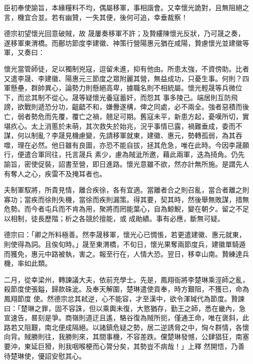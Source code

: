 \begin{pinyinscope}
 臣初奉使諭旨，本緣糧料不均，偶屬移軍，事相諧會。又幸懷光詭對，且無阻絕之言，機宜合並。若有幽贊，一失其便，後何可追，幸垂裁察！



 德宗初望懷光回意破賊，故
 晟屢奏移軍不許；及贄縷陳懷光反狀，乃可晟之奏，遂移軍東渭橋。而鄜坊節度李建徽、神策行營陽惠元猶在咸陽，贄慮懷光並建徽等軍，又奏曰：



 懷光當管師徒，足以獨制兇寇，逗留未進，抑有他由。所患太強，不資傍助。比者又遣李晟、李建徽、陽惠元三節度之眾附麗其營，無益成功，只憂生事。何則？四軍懸壘，群帥異心，論勢力則懸絕高卑，據職名則不相統屬。懷光輕晟等兵微位下，而忿其制不從心。晟等疑懷光養寇蓄奸，而怨其
 事多陵己。端居則互防飛謗，欲戰則遞恐分功，齟齬不和，嫌釁遂構，俾之同處，必不兩全。強者惡積而後亡，弱者勢危而先覆，覆亡之禍，翹足可期。舊寇未平，新患方起，憂嘆所切，實堪疚心。太上消慝於未萌，其次救失於始兆，況乎事情已露，禍難垂成，委而不謀，何以制亂？李晟見機慮變，先請移軍就東，建徽、惠元，勢轉孤弱，為其吞噬，理在必然。他日雖有良圖，亦恐不能自拔，拯其危急，唯在此時。今因李晟願行，便遣合軍同往，托言晟兵
 素少，慮為賊泚所邀，藉此兩軍，迭為掎角。仍先諭旨，密使促裝，詔書至營，即日進路。懷光意雖不欲，然亦計無所施。是謂先人有奪人之心，疾雷不及掩耳者也。



 夫制軍馭將，所貴見情，離合疾徐，各有宜適。當離者合之則召亂，當合者離之則寡功；當疾而徐則失機，當徐而疾則漏策。得其要，契其時，然後舉無敗謀，措無危勢。而今者屯兵而不肯為用，聚將而罔能葉心，自為鯨鯢，變在朝夕。留之不足以相制，徒長歷階；析之各競於擅能，或
 成勛績。事有必應，斷無可疑。



 德宗曰：「卿之所料極善。然李晟移軍，懷光心已惆悵，若更遣建徽、惠元就東，則使得為詞。且俟旬時。」晟至東渭橋，不旬日，懷光果奪兩節度兵，建徽單騎遁而獲免，惠元中路被執，害之。報至行在，人情大恐。翌日，移幸山南。贄練達兵機，率如此類。



 二月，從幸梁州，轉諫議大夫，依前充學士。先是，鳳翔衙將李楚琳乘涇師之亂，殺節度使張鎰，歸款硃泚。及奉天解圍，楚琳遣使貢奉，時方艱阻，不獲已，命為鳳翔節度
 使。然德宗忿其弒逆，心不能容，才至漢中，欲令渾瑊代為節度。贄諫曰：「楚琳之罪，固不容誅，但以乘輿未復，大憝猶存，勤王之師，悉在畿內，急宣速告，晷刻是爭。商嶺則道迂且遙，駱谷復為賊所扼，僅通王命，唯在褒斜，此路若又阻艱，南北便成隔絕。以諸鎮危疑之勢，居二逆誘脅之中，恟々群情，各懷向背。賊勝則往，我勝則來，其間事機，不容差跌。儻楚琳發憾，公肆猖狂，南塞要沖，東延巨猾，則我咽喉梗而心膂分矣，其勢豈不病哉！」上釋
 然開悟，乃善待楚琳使，優詔安慰其心。




\end{pinyinscope}
